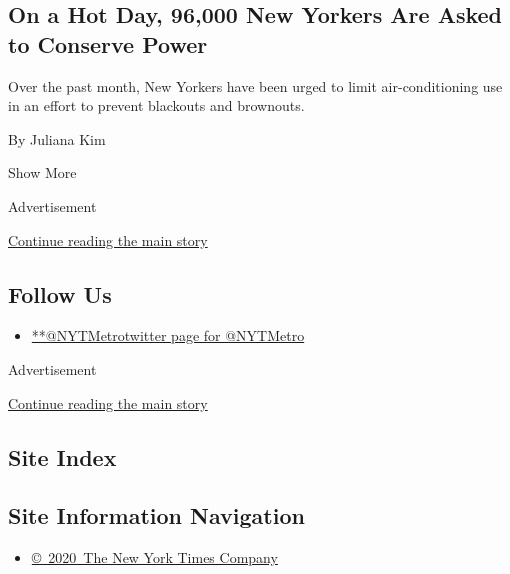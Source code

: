 \begin{enumerate}
  \hypertarget{on-a-hot-day-96000-new-yorkers-are-asked-to-conserve-power}{%
  \subsection{On a Hot Day, 96,000 New Yorkers Are Asked to Conserve
  Power}\label{on-a-hot-day-96000-new-yorkers-are-asked-to-conserve-power}}

  Over the past month, New Yorkers have been urged to limit
  air-conditioning use in an effort to prevent blackouts and brownouts.~

  By Juliana Kim
\end{enumerate}

Show More

Advertisement

\protect\hyperlink{after-mid2}{Continue reading the main story}

\hypertarget{follow-us}{%
\subsection{Follow Us}\label{follow-us}}

\begin{itemize}
\tightlist
\item
  \href{https://twitter.com/NYTMetro}{**@NYTMetrotwitter page for
  @NYTMetro}
\end{itemize}

Advertisement

\protect\hyperlink{after-mktg}{Continue reading the main story}

\hypertarget{site-index}{%
\subsection{Site Index}\label{site-index}}

\hypertarget{site-information-navigation}{%
\subsection{Site Information
Navigation}\label{site-information-navigation}}

\begin{itemize}
\tightlist
\item
  \href{https://help.nytimes3xbfgragh.onion/hc/en-us/articles/115014792127-Copyright-notice}{©~2020~The
  New York Times Company}
\end{itemize}

